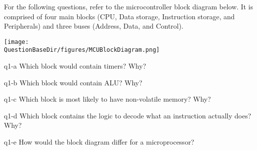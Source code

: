 For the following questions, refer to the microcontroller block diagram below. It is comprised of four main blocks (CPU, Data storage, Instruction storage, and Peripherals) and three buses (Address, Data, and Control).
\begin{center}
  \texttt{[image: \\QuestionBaseDir/figures/MCUBlockDiagram.png]}
\end{center}

\begin{question}{q1-a}
  Which block would contain timers? Why?
\end{question}

\begin{question}{q1-b}
  Which block would contain ALU? Why?
\end{question}

\begin{question}{q1-c}
  Which block is most likely to have non-volatile memory? Why?
\end{question}

\begin{question}{q1-d}
  Which block contains the logic to decode what an instruction actually does? Why?
\end{question}

\begin{question}{q1-e}
  How would the block diagram differ for a microprocessor?
\end{question}

